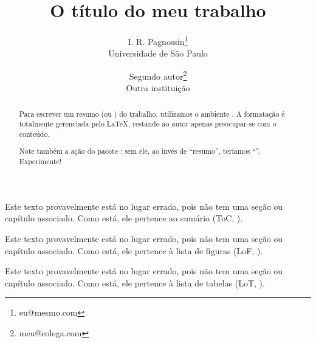 \documentclass[a4paper,12pt]{report}
\title{{\Huge\bfseries O título do meu trabalho}} %
\author{%
		I. R. Pagnossin\thanks{eu@mesmo.com} \\ Universidade de São Paulo
		\and
		Segundo autor\thanks{meu@colega.com} \\ Outra instituição}
\begin{document}
	\maketitle %

	\begin{abstract}
		Para escrever um resumo (ou ) do trabalho, utilizamos
		o ambiente . A formatação é totalmente gerenciada pelo \LaTeX,
		restando ao autor apenas preocupar-se com o conteúdo.
		
		Note também a ação do pacote : sem ele, ao invés de ``resumo'',
		teríamos ``''. Experimente!
	\end{abstract}

	\tableofcontents %

	Este texto provavelmente está no lugar errado, pois não tem uma seção ou
	capítulo associado. Como está, ele pertence ao sumário (ToC, ).
	
	\listoffigures   %

	Este texto provavelmente está no lugar errado, pois não tem uma seção ou
	capítulo associado. Como está, ele pertence à lista de figuras (LoF,
	).
	
	\listoftables    %

	Este texto provavelmente está no lugar errado, pois não tem uma seção ou
	capítulo associado. Como está, ele pertence à lista de tabelas (LoT,
	).
\end{document}
